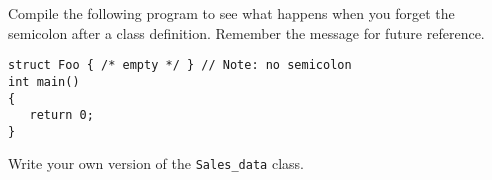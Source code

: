 %
%
\begin{question}
Compile the following program to see what happens when
you forget the semicolon after a class definition. Remember the message for
future reference.
\begin{lstlisting}
struct Foo { /* empty */ } // Note: no semicolon
int main()
{
   return 0;
}
\end{lstlisting}
\end{question}

\begin{question}\label{qst:your own sales-data class}
Write your own version of the \verb|Sales_data| class.
\end{question}
